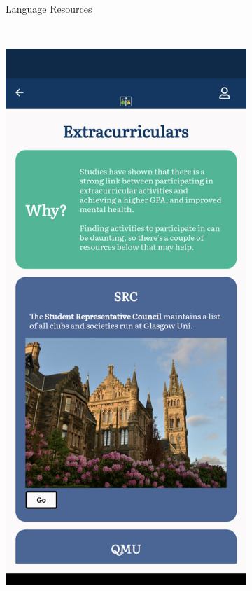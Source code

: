 \documentclass{l4proj}
\begin{document}
\begin{figure}[ht]
\begin{subfigure}[b]{0.25\textwidth}
        \caption{Language Resources}
        \label{fig:prepareenglish}
    \end{subfigure}
    ~ %
    \begin{subfigure}[b]{0.25\textwidth}
        \includegraphics[width=\textwidth]{images/prepareBackground3.pdf}

\end{subfigure}
\end{figure}
\end{document}
